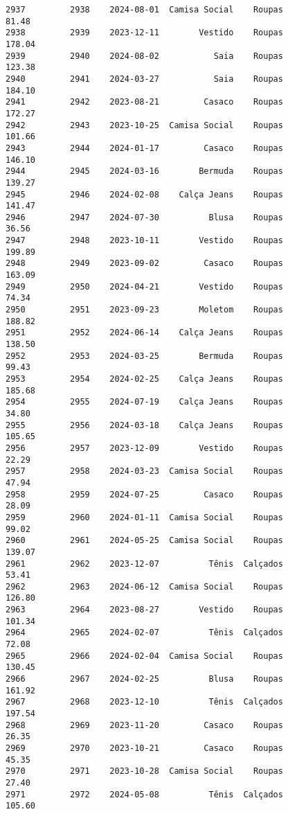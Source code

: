 \documentclass[11pt]{article}
\begin{document}
\begin{Verbatim}[commandchars=\\\{\}]
2937         2938    2024-08-01  Camisa Social    Roupas           81.48   
2938         2939    2023-12-11        Vestido    Roupas          178.04   
2939         2940    2024-08-02           Saia    Roupas          123.38   
2940         2941    2024-03-27           Saia    Roupas          184.10   
2941         2942    2023-08-21         Casaco    Roupas          172.27   
2942         2943    2023-10-25  Camisa Social    Roupas          101.66   
2943         2944    2024-01-17         Casaco    Roupas          146.10   
2944         2945    2024-03-16        Bermuda    Roupas          139.27   
2945         2946    2024-02-08    Calça Jeans    Roupas          141.47   
2946         2947    2024-07-30          Blusa    Roupas           36.56   
2947         2948    2023-10-11        Vestido    Roupas          199.89   
2948         2949    2023-09-02         Casaco    Roupas          163.09   
2949         2950    2024-04-21        Vestido    Roupas           74.34   
2950         2951    2023-09-23        Moletom    Roupas          188.82   
2951         2952    2024-06-14    Calça Jeans    Roupas          138.50   
2952         2953    2024-03-25        Bermuda    Roupas           99.43   
2953         2954    2024-02-25    Calça Jeans    Roupas          185.68   
2954         2955    2024-07-19    Calça Jeans    Roupas           34.80   
2955         2956    2024-03-18    Calça Jeans    Roupas          105.65   
2956         2957    2023-12-09        Vestido    Roupas           22.29   
2957         2958    2024-03-23  Camisa Social    Roupas           47.94   
2958         2959    2024-07-25         Casaco    Roupas           28.09   
2959         2960    2024-01-11  Camisa Social    Roupas           99.02   
2960         2961    2024-05-25  Camisa Social    Roupas          139.07   
2961         2962    2023-12-07          Tênis  Calçados           53.41   
2962         2963    2024-06-12  Camisa Social    Roupas          126.80   
2963         2964    2023-08-27        Vestido    Roupas          101.34   
2964         2965    2024-02-07          Tênis  Calçados           72.08   
2965         2966    2024-02-04  Camisa Social    Roupas          130.45   
2966         2967    2024-02-25          Blusa    Roupas          161.92   
2967         2968    2023-12-10          Tênis  Calçados          197.54   
2968         2969    2023-11-20         Casaco    Roupas           26.35   
2969         2970    2023-10-21         Casaco    Roupas           45.35   
2970         2971    2023-10-28  Camisa Social    Roupas           27.40   
2971         2972    2024-05-08          Tênis  Calçados          105.60   

\end{Verbatim}
\end{document}
